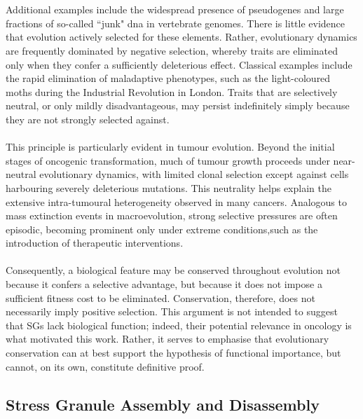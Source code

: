 \\
\\
Additional examples include the widespread presence of pseudogenes and large fractions of so-called “junk" \gls{dna} in vertebrate genomes\cite{nishikimi_cloning_1994}. There is little evidence that evolution actively selected for these elements\cite{nishikimi_cloning_1994}. Rather, evolutionary dynamics are frequently dominated by negative selection, whereby traits are eliminated only when they confer a sufficiently deleterious effect. Classical examples include the rapid elimination of maladaptive phenotypes, such as the light-coloured moths during the Industrial Revolution in London\cite{cook_peppered_2013}. Traits that are selectively neutral, or only mildly disadvantageous, may persist indefinitely simply because they are not strongly selected against\cite{nishikimi_cloning_1994, williams_identification_2016}.
\\
\\
This principle is particularly evident in tumour evolution. Beyond the initial stages of oncogenic transformation, much of tumour growth proceeds under near-neutral evolutionary dynamics, with limited clonal selection except against cells harbouring severely deleterious mutations\cite{williams_identification_2016}. This neutrality helps explain the extensive intra-tumoural heterogeneity observed in many cancers\cite{williams_identification_2016}. Analogous to mass extinction events in macroevolution\cite{marshall_forty_2023}, strong selective pressures are often episodic, becoming prominent only under extreme conditions,such as the introduction of therapeutic interventions\cite{williams_identification_2016}.
\\
\\
Consequently, a biological feature may be conserved throughout evolution not because it confers a selective advantage, but because it does not impose a sufficient fitness cost to be eliminated. Conservation, therefore, does not necessarily imply positive selection. This argument is not intended to suggest that SGs lack biological function; indeed, their potential relevance in oncology is what motivated this work. Rather, it serves to emphasise that evolutionary conservation can at best support the hypothesis of functional importance, but cannot, on its own, constitute definitive proof.

\subsection{Stress Granule Assembly and Disassembly}

